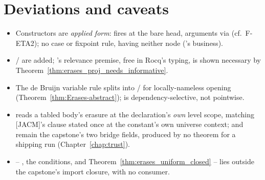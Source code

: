 \section*{Deviations and caveats}
\begin{itemize}
\item Constructors are \emph{applied form}:  fires at the bare head, arguments via  (cf.\ F-ETA2); no case or fixpoint rule,  having neither node (\Lower{}'s business).
\item {}/ are added; 's relevance premise, free in Rocq's typing, is shown necessary by Theorem~\ref{thm:erases_proj_needs_informative}.
\item The de Bruijn variable rule splits into / for locally-nameless opening (Theorem~\ref{thm:Erases-abstract}); \ErasesEnv{} is dependency-selective, not pointwise.
\item {}  reads a tabled body's erasure at the declaration's \emph{own} level scope, matching [JACM]'s clause stated once at the constant's own universe context; \stOpen{} \ErasesEnv{} and \LowerEnv{} remain the capstone's two bridge fields, produced by no theorem for a shipping run (Chapter~\ref{chap:trust}).
\item {} -- , the  conditions, and Theorem~\ref{thm:erases_uniform_closed} -- lies outside the capstone's import closure, with no consumer.
\end{itemize}
